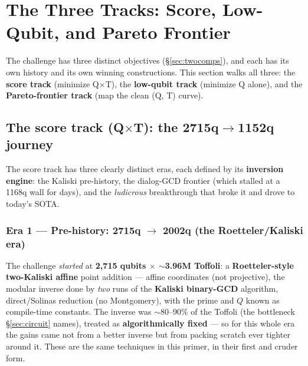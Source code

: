\documentclass[11pt,a4paper]{article}
\begin{document}
\section{The Three Tracks: Score, Low-Qubit, and Pareto Frontier}
\label{sec:history}

The challenge has three distinct objectives (\S\ref{sec:twocomps}), and each has its own history and
its own winning constructions. This section walks all three: the \textbf{score track} (minimize
Q$\times$T), the \textbf{low-qubit track} (minimize Q alone), and the \textbf{Pareto-frontier track}
(map the clean (Q, T) curve).

\subsection{The score track (Q$\times$T): the 2715q$\to$1152q journey}

The score track has three clearly distinct eras, each defined by its \textbf{inversion engine}: the
Kaliski pre-history, the dialog-GCD frontier (which stalled at a 1168q wall for days), and the
\emph{ludicrous} breakthrough that broke it and drove to today's SOTA.

\subsubsection{Era 1 --- Pre-history: 2715q $\to$ 2002q (the Roetteler/Kaliski era)}

The challenge \emph{started} at \textbf{2{,}715 qubits $\times$ $\sim$3.96M Toffoli}: a
\textbf{Roetteler-style two-Kaliski affine} point addition --- affine coordinates (not projective),
the modular inverse done by \emph{two} runs of the \textbf{Kaliski binary-GCD} algorithm,
direct/Solinas reduction (no Montgomery), with the prime and $Q$ known as compile-time constants. The
inverse was $\sim$80--90\% of the Toffoli (the bottleneck \S\ref{sec:circuit} names), treated as
\textbf{algorithmically fixed} --- so for this whole era the gains came not from a better inverse but
from packing scratch ever tighter around it. These are the same techniques in this primer, in their
first and cruder form.
\end{document}
